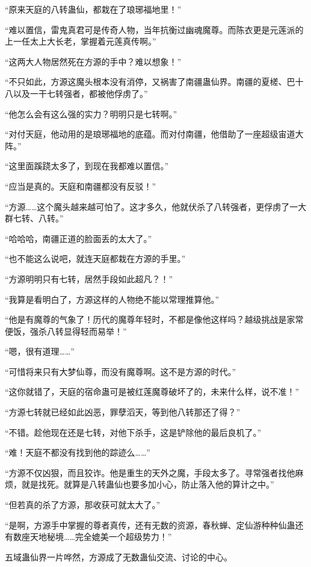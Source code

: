 
\begin{this_body}

“原来天庭的八转蛊仙，都栽在了琅琊福地里！”

“难以置信，雷鬼真君可是传奇人物，当年抗衡过幽魂魔尊。而陈衣更是元莲派的上一任太上大长老，掌握着元莲真传啊。”

“这两大人物居然死在方源的手中？难以想象！”

“不只如此，方源这魔头根本没有消停，又祸害了南疆蛊仙界。南疆的夏槎、巴十八以及一干七转强者，都被他俘虏了。”

“他怎么会有这么强的实力？明明只是七转啊。”

“对付天庭，他动用的是琅琊福地的底蕴。而对付南疆，他借助了一座超级宙道大阵。”

“这里面蹊跷太多了，到现在我都难以置信。”

“应当是真的。天庭和南疆都没有反驳！”

“方源……这个魔头越来越可怕了。这才多久，他就伏杀了八转强者，更俘虏了一大群七转、八转。”

“哈哈哈，南疆正道的脸面丢的太大了。”

“也不能这么说吧，就连天庭都栽在方源的手里。”

“方源明明只有七转，居然手段如此超凡？！”

“我算是看明白了，方源这样的人物绝不能以常理推算他。”

“他是有魔尊的气象了！历代的魔尊年轻时，不都是像他这样吗？越级挑战是家常便饭，强杀八转显得轻而易举！”

“嗯，很有道理……”

“可惜将来只有大梦仙尊，而没有魔尊啊。这不是方源的时代。”

“这你就错了，天庭的宿命蛊可是被红莲魔尊破坏了的，未来什么样，说不准！”

“方源七转就已经如此凶恶，罪孽滔天，等到他八转那还了得？”

“不错。趁他现在还是七转，对他下杀手，这是铲除他的最后良机了。”

“难！天庭不都没有找到他的踪迹么……”

“方源不仅凶狠，而且狡诈。他是重生的天外之魔，手段太多了。寻常强者找他麻烦，就是找死。就算是八转蛊仙也要多加小心，防止落入他的算计之中。”

“但若真的杀了方源，那收获可就太大了。”

“是啊，方源手中掌握的尊者真传，还有无数的资源，春秋蝉、定仙游种种仙蛊还有数座天地秘境……完全媲美一个超级势力！”

五域蛊仙界一片哗然，方源成了无数蛊仙交流、讨论的中心。


\end{this_body}

